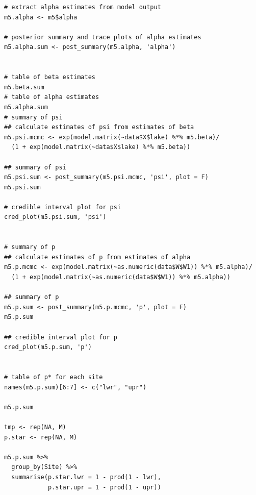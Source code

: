 \documentclass[12pt]{article}\usepackage[]{graphicx}\usepackage[]{color}
\makeatletter
\newenvironment{kframe}{%
 \def\at@end@of@kframe{}%
 \ifinner\ifhmode%
  \def\at@end@of@kframe{\end{minipage}}%
  \begin{minipage}{\columnwidth}%
 \fi\fi%
 \def\FrameCommand##1{\hskip\@totalleftmargin \hskip-\fboxsep
 \colorbox{shadecolor}{##1}\hskip-\fboxsep
     \hskip-\linewidth \hskip-\@totalleftmargin \hskip\columnwidth}%
 \MakeFramed {\advance\hsize-\width
   \@totalleftmargin\z@ \linewidth\hsize
   \@setminipage}}%
 {\par\unskip\endMakeFramed%
 \at@end@of@kframe}
\newenvironment{knitrout}{}{} %
\newenvironment{kframe}{%
 \def\at@end@of@kframe{}%
 \ifinner\ifhmode%
  \def\at@end@of@kframe{\end{minipage}}%
  \begin{minipage}{\columnwidth}%
 \fi\fi%
 \def\FrameCommand##1{\hskip\@totalleftmargin \hskip-\fboxsep
 \colorbox{shadecolor}{##1}\hskip-\fboxsep
     \hskip-\linewidth \hskip-\@totalleftmargin \hskip\columnwidth}%
 \MakeFramed {\advance\hsize-\width
   \@totalleftmargin\z@ \linewidth\hsize
   \@setminipage}}%
 {\par\unskip\endMakeFramed%
 \at@end@of@kframe}
\newenvironment{knitrout}{}{} %
\makeatother
\begin{document}
\begin{small}
\begin{knitrout}
\begin{kframe}
\begin{verbatim}
# extract alpha estimates from model output
m5.alpha <- m5$alpha

# posterior summary and trace plots of alpha estimates
m5.alpha.sum <- post_summary(m5.alpha, 'alpha')


# table of beta estimates
m5.beta.sum
# table of alpha estimates
m5.alpha.sum
# summary of psi
## calculate estimates of psi from estimates of beta
m5.psi.mcmc <- exp(model.matrix(~data$X$lake) %*% m5.beta)/
  (1 + exp(model.matrix(~data$X$lake) %*% m5.beta))

## summary of psi
m5.psi.sum <- post_summary(m5.psi.mcmc, 'psi', plot = F)
m5.psi.sum

# credible interval plot for psi
cred_plot(m5.psi.sum, 'psi')


# summary of p
## calculate estimates of p from estimates of alpha
m5.p.mcmc <- exp(model.matrix(~as.numeric(data$W$W1)) %*% m5.alpha)/
  (1 + exp(model.matrix(~as.numeric(data$W$W1)) %*% m5.alpha))

## summary of p
m5.p.sum <- post_summary(m5.p.mcmc, 'p', plot = F)
m5.p.sum 

## credible interval plot for p
cred_plot(m5.p.sum, 'p')


# table of p* for each site
names(m5.p.sum)[6:7] <- c("lwr", "upr")

m5.p.sum

tmp <- rep(NA, M)
p.star <- rep(NA, M)

m5.p.sum %>%
  group_by(Site) %>% 
  summarise(p.star.lwr = 1 - prod(1 - lwr), 
            p.star.upr = 1 - prod(1 - upr)) 
\end{verbatim}
\end{kframe}
\end{knitrout}

\end{small}

\end{document}
